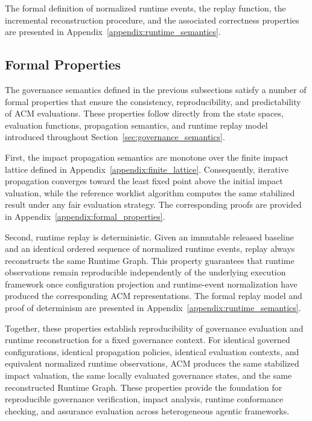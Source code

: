 \documentclass[10pt]{article}
\begin{document}
The formal definition of normalized runtime events, the replay function, the
incremental reconstruction procedure, and the associated correctness properties
are presented in Appendix~\ref{appendix:runtime_semantics}.

\subsection{Formal Properties}
\label{sec:formal_properties}

The governance semantics defined in the previous subsections satisfy a number of formal properties that ensure the consistency, reproducibility, and predictability of ACM evaluations. These properties follow directly from the state spaces, evaluation functions, propagation semantics, and runtime replay model introduced throughout Section~\ref{sec:governance_semantics}.

First, the impact propagation semantics are monotone over the finite impact lattice defined in Appendix~\ref{appendix:finite_lattice}. Consequently, iterative propagation converges toward the least fixed point above the initial impact valuation, while the reference worklist algorithm computes the same stabilized result under any fair evaluation strategy. The corresponding proofs are provided in Appendix~\ref{appendix:formal_properties}.

Second, runtime replay is deterministic. Given an immutable released baseline and an identical ordered sequence of normalized runtime events, replay always reconstructs the same Runtime Graph. This property guarantees that runtime observations remain reproducible independently of the underlying execution framework once configuration projection and runtime-event normalization have produced the corresponding ACM representations. The formal replay model and proof of determinism are presented in Appendix~\ref{appendix:runtime_semantics}.

Together, these properties establish reproducibility of governance evaluation and runtime reconstruction for a fixed governance context. For identical governed configurations, identical propagation policies, identical evaluation contexts, and equivalent normalized runtime observations, ACM produces the same
stabilized impact valuation, the same locally evaluated governance states, and the same reconstructed Runtime Graph. These properties provide the foundation for reproducible governance verification, impact analysis, runtime conformance checking, and assurance evaluation across heterogeneous agentic frameworks.
\end{document}
